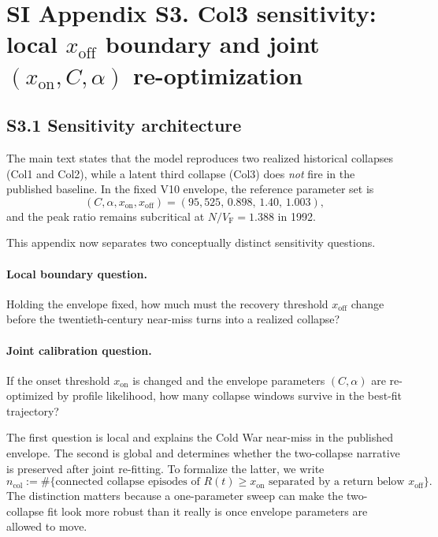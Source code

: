 \documentclass[11pt]{article}
\newcommand{\VF}{V_{\mathrm{F}}}
\newcommand{\xon}{x_{\mathrm{on}}}
\newcommand{\xoff}{x_{\mathrm{off}}}
\begin{document}
\pagebreak


\section*{SI Appendix S3. Col3 sensitivity: local \texorpdfstring{$x_{\mathrm{off}}$}{x\_off} boundary and joint \texorpdfstring{$(x_{\mathrm{on}},C,\alpha)$}{(x\_on,C,alpha)} re-optimization}

\subsection*{S3.1 Sensitivity architecture}

The main text states that the model reproduces two realized historical collapses (Col1 and Col2), while a latent third collapse (Col3) does \emph{not} fire in the published baseline. In the fixed V10 envelope, the reference parameter set is
\begin{equation}
(C,\alpha,\xon,\xoff)=(95{,}525,\,0.898,\,1.40,\,1.003),
\end{equation}
and the peak ratio remains subcritical at $N/\VF=1.388$ in 1992.

This appendix now separates two conceptually distinct sensitivity questions.

\paragraph{Local boundary question.} Holding the envelope fixed, how much must the recovery threshold $\xoff$ change before the twentieth-century near-miss turns into a realized collapse?

\paragraph{Joint calibration question.} If the onset threshold $\xon$ is changed and the envelope parameters $(C,\alpha)$ are re-optimized by profile likelihood, how many collapse windows survive in the best-fit trajectory?

The first question is local and explains the Cold War near-miss in the published envelope. The second is global and determines whether the two-collapse narrative is preserved after joint re-fitting. To formalize the latter, we write
\begin{equation}
n_{\mathrm{col}}:=\#\{\text{connected collapse episodes of }R(t)\ge \xon\text{ separated by a return below }\xoff\}.
\end{equation}
The distinction matters because a one-parameter sweep can make the two-collapse fit look more robust than it really is once envelope parameters are allowed to move.
\end{document}
